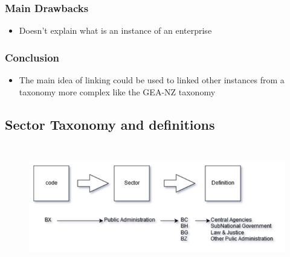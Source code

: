 \documentclass[12pt]{report}
\begin{document}
\subsubsection*{Main Drawbacks }
\begin{itemize}
	\item Doesn’t explain what is an instance of an enterprise  \par


\end{itemize}\subsubsection*{Conclusion }
\begin{itemize}
	\item The main idea of linking could be used to linked other instances from a taxonomy more complex like the GEA-NZ taxonomy \par




\newpage

\vspace{\baselineskip}
\end{itemize}\subsection*{Sector Taxonomy and definitions}

\vspace{\baselineskip}



\begin{figure}[H]
	\begin{Center}
		\includegraphics[width=6.06in,height=2.16in]{./media/image10.png}
	\end{Center}
\end{figure}
\end{document}
